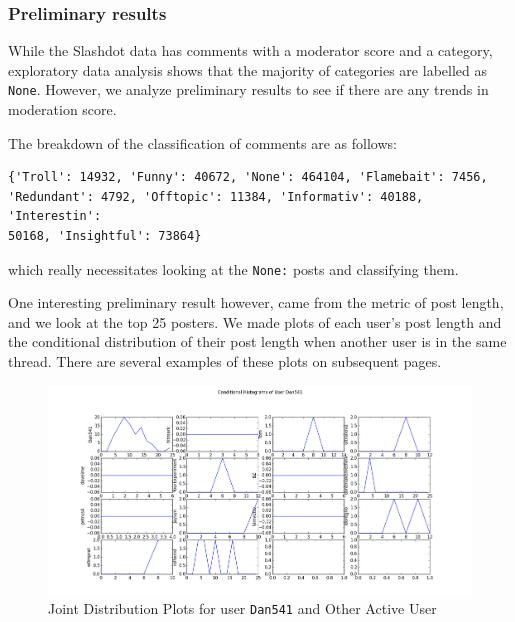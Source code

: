 \documentclass[a4paper,12pt]{article}
\numberwithin{equation}{section}
\begin{document}





\subsubsection*{Preliminary results}

While the Slashdot data has comments with a moderator score and a category, exploratory data analysis shows that the majority of categories are labelled as {\tt None}. However, we analyze preliminary results to see if there are any trends in moderation score.


The breakdown of the classification of comments are as follows:
\vspace*{-0.5cm}
\begin{verbatim}
{'Troll': 14932, 'Funny': 40672, 'None': 464104, 'Flamebait': 7456, 
'Redundant': 4792, 'Offtopic': 11384, 'Informativ': 40188, 'Interestin': 
50168, 'Insightful': 73864}
\end{verbatim}
which really necessitates looking at the {\tt None:} posts and classifying them. 

One interesting preliminary result however, came from the metric of post length, and we look at the top 25 posters. We made plots of each user's post length and the conditional distribution of their post length when another user is in the same thread. There are several examples of these plots on subsequent pages.

\begin{figure}[here!]
\begin{center}
\includegraphics[scale=0.46, angle = 90]{Dan541.png}
\caption{Joint Distribution Plots for user {\tt Dan541} and Other Active User}
\end{center}
\end{figure}
\end{document}

